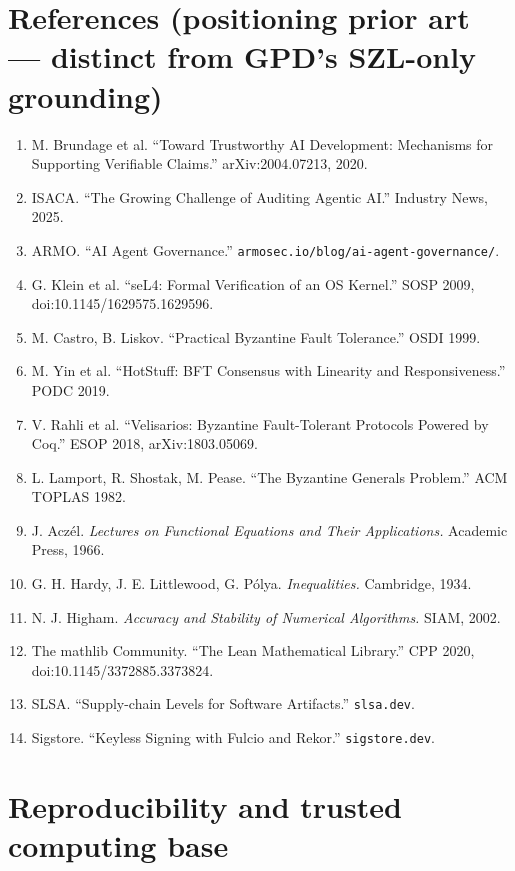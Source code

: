 \documentclass[11pt,letterpaper]{article}
\theoremstyle{definition}
\begin{document}
\section{References (positioning prior art --- distinct from GPD's SZL-only grounding)}\label{sec:refs}

\begin{enumerate}\small
\item M. Brundage et al. ``Toward Trustworthy AI Development: Mechanisms for
Supporting Verifiable Claims.'' arXiv:2004.07213, 2020.
\item ISACA. ``The Growing Challenge of Auditing Agentic AI.'' Industry News,
2025.
\item ARMO. ``AI Agent Governance.'' \texttt{armosec.io/blog/ai-agent-governance/}.
\item G. Klein et al. ``seL4: Formal Verification of an OS Kernel.'' SOSP 2009,
doi:10.1145/1629575.1629596.
\item M. Castro, B. Liskov. ``Practical Byzantine Fault Tolerance.'' OSDI 1999.
\item M. Yin et al. ``HotStuff: BFT Consensus with Linearity and Responsiveness.''
PODC 2019.
\item V. Rahli et al. ``Velisarios: Byzantine Fault-Tolerant Protocols Powered by
Coq.'' ESOP 2018, arXiv:1803.05069.
\item L. Lamport, R. Shostak, M. Pease. ``The Byzantine Generals Problem.'' ACM
TOPLAS 1982.
\item J. Acz\'el. \emph{Lectures on Functional Equations and Their Applications.}
Academic Press, 1966.
\item G. H. Hardy, J. E. Littlewood, G. P\'olya. \emph{Inequalities.} Cambridge,
1934.
\item N. J. Higham. \emph{Accuracy and Stability of Numerical Algorithms.} SIAM,
2002.
\item The mathlib Community. ``The Lean Mathematical Library.'' CPP 2020,
doi:10.1145/3372885.3373824.
\item SLSA. ``Supply-chain Levels for Software Artifacts.'' \texttt{slsa.dev}.
\item Sigstore. ``Keyless Signing with Fulcio and Rekor.'' \texttt{sigstore.dev}.
\end{enumerate}

\appendix
\section{Reproducibility and trusted computing base}
\end{document}
